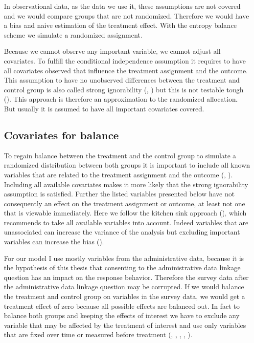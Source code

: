In observational data, as the data we use it, these assumptions are not covered and we would compare groups that are not randomized. Therefore we would have a bias and naive estimation of the treatment effect. With the entropy balance scheme we simulate a randomized assignment.

Because we cannot observe any important variable, we cannot adjust all covariates. To fulfill the conditional independence assumption it requires to have all covariates observed that influence the treatment assignment and the outcome. This assumption to have no unobserved differences between the treatment and control group is also called strong ignorability (\cite{Stuart10}, \cite{Eckmanetal15b}) but this is not testable tough (\cite{Imbens04}). This approach is therefore an approximation to the randomized allocation. But usually it is assumed to have all important covariates covered.

\subsection{Covariates for balance}\label{covar}
	
To regain balance between the treatment and the control group to simulate a randomized distribution between both groups it is important to include all known variables that are related to the treatment assignment and the outcome (\cite{Stuart10}, \cite{Eckmanetal15}). Including all available covariates makes it more likely that the strong ignorability assumption is satisfied. Further the listed variables presented below have not consequently an effect on the treatment assignment or outcome, at least not one that is viewable immediately. Here we follow the kitchen sink approach (\cite{Eckmanetal15b}), which recommends to take all available variables into account. Indeed variables that are unassociated can increase the variance of the analysis but excluding important variables can increase the bias (\cite{Stuart10}).

For our model I use mostly variables from the administrative data, because it is the hypothesis of this thesis that consenting to the administrative data linkage question has an impact on the response behavior. Therefore the survey data after the administrative data linkage question may be corrupted. If we would balance the treatment and control group on variables in the survey data, we would get a treatment effect of zero because all possible effects are balanced out. In fact to balance both groups and keeping the effects of interest we have to exclude any variable that may be affected by the treatment of interest and use only variables that are fixed over time or measured before treatment (\cite{Rosenbaum84}, \cite{Frangakisetal02}, \cite{Greenland03}, \cite{Eckmanetal15b}, \cite{Caliendoetal08}).

